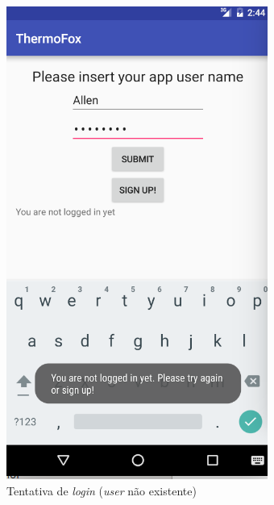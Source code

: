\documentclass[a4paper]{article}
\begin{document}
\begin{figure}[H]
  \includegraphics[width=\linewidth]{welcome.png}
  \caption{Tentativa de \textit{login} (\textit{user} não existente)}\label{fig:newUser}
\endminipage\hfill
{}%

\end{figure}
\end{document}
